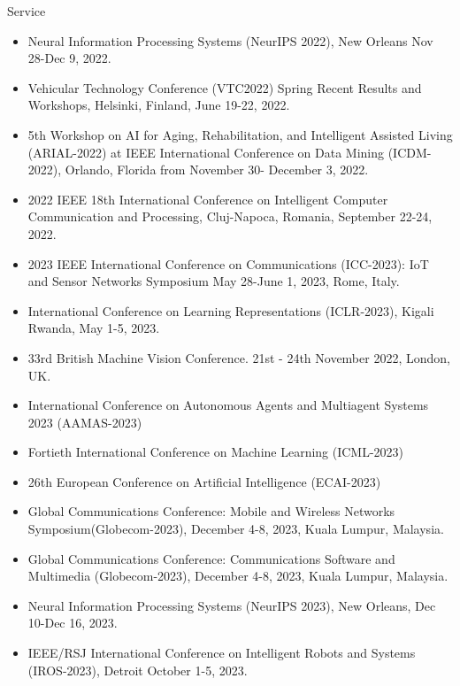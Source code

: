 \begin{category}{Service}
\begin{itemize}
\item Neural Information Processing Systems (NeurIPS 2022), New Orleans Nov 28-Dec 9, 2022.

\item Vehicular Technology Conference (VTC2022) Spring Recent Results and Workshops, Helsinki, Finland, June 19-22, 2022.

\item 5th Workshop on AI for Aging, Rehabilitation, and Intelligent Assisted Living (ARIAL-2022) at IEEE International Conference on Data Mining (ICDM-2022), Orlando, Florida from November 30- December 3, 2022.

\item 2022 IEEE 18th International Conference on Intelligent Computer Communication and Processing,  Cluj-Napoca, Romania, September 22-24, 2022. 

\item 2023 IEEE International Conference on Communications (ICC-2023): IoT and Sensor Networks Symposium May 28-June 1, 2023, Rome, Italy.

\item International Conference on Learning Representations (ICLR-2023), Kigali Rwanda, May 1-5, 2023.

\item 33rd British Machine Vision Conference. 21st - 24th November 2022, London, UK.

\item International Conference on Autonomous Agents and Multiagent Systems 2023 (AAMAS-2023)

\item Fortieth International Conference on Machine Learning (ICML-2023)

\item 26th European Conference on Artificial Intelligence (ECAI-2023)

\item Global Communications Conference: Mobile and Wireless Networks Symposium(Globecom-2023), December 4-8, 2023, Kuala Lumpur, Malaysia.

\item Global Communications Conference: Communications Software and Multimedia (Globecom-2023), December 4-8, 2023, Kuala Lumpur, Malaysia.


\item Neural Information Processing Systems (NeurIPS 2023), New Orleans, Dec 10-Dec 16, 2023.

\item IEEE/RSJ International Conference on Intelligent Robots and Systems (IROS-2023), Detroit October 1-5, 2023. 


\end{itemize}
\end{category}
